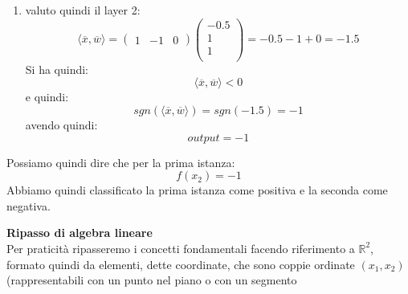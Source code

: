 \begin{esercizio}
\begin{enumerate}
\[\begin{matrix}
									      			      		1    \\
									      			      		1    \\
									      			      	\end{matrix}
									      			      	\right)= -1.5+1+0 = -0.5\]
									      			      	Si ha quindi:
									      			      	\[\langle \overline{x},\overline{w}\rangle< 0\]
									      			      	e quindi:
									      			      	\[sgn(\langle \overline{x},\overline{w}\rangle)=sgn(-0.5)=-1\]
									      			      	avendo quindi:
									      			      	\[y_h=-1\]
									      			      	che sarà tra gli input del secondo layer
									      			      	\item valuto quindi il layer 2:
									      			      	\[\langle \overline{x},\overline{w}\rangle=
									      			      		\left(\begin{matrix}
									      			      		1 & -1 & 0
									      			      		\end{matrix}\right)
									      			      		\left(
									      			      		\begin{matrix}
									      			      			-0.5 \\
									      			      			1    \\
									      			      			1    \\
									      			      		\end{matrix}
									      			      		\right)= -0.5-1+0 = -1.5\]
									      			      		Si ha quindi:
									      			      		\[\langle \overline{x},\overline{w}\rangle < 0\]
									      			      		e quindi:
									      			      		\[sgn(\langle \overline{x},\overline{w}\rangle)=sgn(-1.5)=-1\]
									      			      		avendo quindi:
									      			      		\[output=-1\]
									      			      		\end{enumerate}
									      			      		Possiamo quindi dire che per la prima istanza:
									      			      		\[f(x_2)=-1\]
									      			      		Abbiamo quindi classificato la prima istanza come positiva e la seconda come
									      			      		negativa.
									      			      		\begin{shaded}
									      			      			\textbf{Ripasso di algebra lineare}\\
									      			      			Per praticità ripasseremo i concetti fondamentali facendo riferimento a
									      			      			$\mathbb{R}^2$, formato quindi da elementi, dette coordinate, che sono coppie
									      			      			ordinate $(x_1, x_2)$ (rappresentabili con un punto nel piano o con un segmento

\end{shaded}
\end{esercizio}
